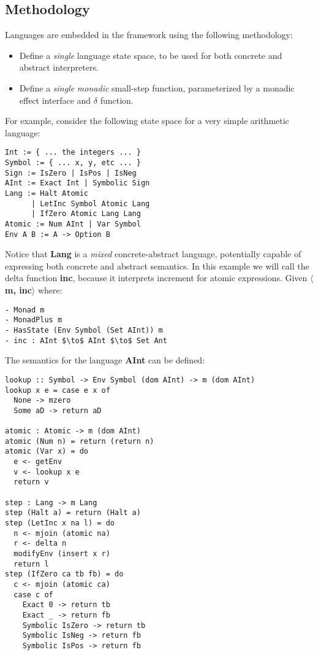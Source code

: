 \documentclass{article}
\begin{document}
\subsection{Methodology}
Languages are embedded in the framework using the following methodology:
\begin{itemize}
  \item 
  Define a \textit{single} language state space, to be used for both concrete
  and abstract interpreters.
  \item 
  Define a \textit{single} \textit{monadic} small-step function, parameterized
  by a monadic effect interface and $\delta$ function.
\end{itemize}
For example, consider the following state space for a very simple arithmetic
language:
\begin{lstlisting}[mathescape]
Int := { ... the integers ... }
Symbol := { ... x, y, etc ... }
Sign := IsZero | IsPos | IsNeg
AInt := Exact Int | Symbolic Sign
Lang := Halt Atomic 
      | LetInc Symbol Atomic Lang 
      | IfZero Atomic Lang Lang 
Atomic := Num AInt | Var Symbol
Env A B := A -> Option B
\end{lstlisting}
Notice that \textbf{Lang} is a \textit{mixed} concrete-abstract language,
potentially capable of expressing both concrete and abstract semantics.
%
In this example we will call the delta function \textbf{inc}, because it
interprets increment for atomic expressions. Given \textbf{$\langle$m,
inc$\rangle$} where:
\begin{lstlisting}[mathescape]
- Monad m
- MonadPlus m
- HasState (Env Symbol (Set AInt)) m
- inc : AInt $\to$ AInt $\to$ Set Ant
\end{lstlisting}
The semantics for the language \textbf{AInt} can be defined:
\begin{lstlisting}[mathescape]
lookup :: Symbol -> Env Symbol (dom AInt) -> m (dom AInt)
lookup x e = case e x of
  None -> mzero
  Some aD -> return aD

atomic : Atomic -> m (dom AInt)
atomic (Num n) = return (return n)
atomic (Var x) = do
  e <- getEnv
  v <- lookup x e
  return v

step : Lang -> m Lang
step (Halt a) = return (Halt a)
step (LetInc x na l) = do
  n <- mjoin (atomic na)
  r <- delta n
  modifyEnv (insert x r)
  return l
step (IfZero ca tb fb) = do
  c <- mjoin (atomic ca)
  case c of
    Exact 0 -> return tb
    Exact _ -> return fb
    Symbolic IsZero -> return tb
    Symbolic IsNeg -> return fb
    Symbolic IsPos -> return fb
\end{lstlisting}
\end{document}
